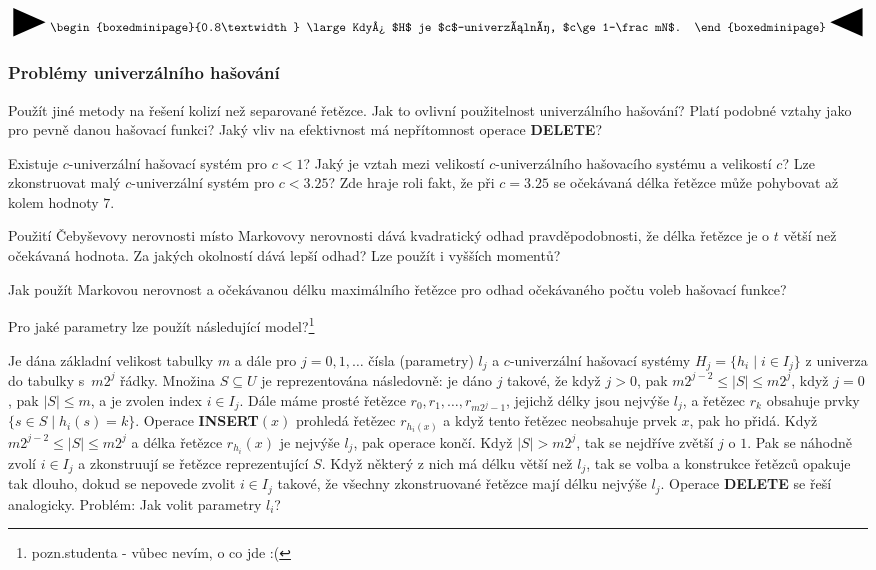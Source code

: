 \documentclass[a4paper,12pt]{article}
\newcommand{\zapamatovat}[1]{
 {
 
 \setlength\fboxrule{5pt}
 \begin{center}
 $\vcenter{
 \hbox{\raisebox{-0.8ex}{\scalebox{1.7}{\Huge\RIGHTarrow}}\begin{boxedminipage}{0.8\textwidth}
\large #1
 \end{boxedminipage}\raisebox{-0.8ex}{\scalebox{1.7}{\Huge\LEFTarrow}}}}$
 \end{center}
 }
 }
\begin{document}
\zapamatovat{
Když $H$ je $c$-univerzální, $c\ge 1-\frac mN$.
}

\subsubsection{Problémy univerzálního hašování}

Použít jiné metody na řešení kolizí než 
separované řetězce.
Jak to ovlivní použitelnost 
univerzálního hašování? Platí podobné vztahy jako pro 
pevně danou hašovací funkci? Jaký vliv na efektivnost 
má nepřítomnost operace {\bf DELETE}?

Existuje $c$-univerzální hašovací systém pro 
$c<1$? Jaký je vztah mezi velikostí $c$-univerzální\-ho 
hašovacího systému a velikostí $c$? Lze zkonstruovat 
malý $c$-univerzální systém pro $c<3.25$? Zde hraje roli 
fakt, že při $c=3.25$ se očekávaná délka řetězce 
může pohybovat až kolem hodnoty $7$.

Použití Čebyševovy nerovnosti místo 
Markovovy nerovnosti dává kvadratický odhad 
prav\-dě\-podobnosti, že délka řetězce je o $t$ větší než 
očekávaná hodnota. Za jakých okolností dává lepší 
odhad? Lze použít i vyšších momentů?

Jak použít Markovou nerovnost a očekávanou 
délku maximál\-ní\-ho řetězce pro odhad očeká\-va\-ného 
počtu voleb hašovací funk\-ce? 

Pro jaké parametry lze použít následující model?\footnote{pozn.studenta - vůbec nevím, o co jde :(}

Je dána základní velikost tabulky $m$ a dále pro $
j=0,1,\dots$ 
čísla (parametry) $l_j$ a $c$-univer\-zál\-ní hašovací systémy 
$H_j=\{h_i\mid i\in I_j\}$ z univerza do tabulky s~$m2^j$ řádky.\newline 
Množina $S\subseteq U$ je reprezentována následovně:  je dáno $
j$ 
tako\-vé, že když $j>0$, pak $m2^{j-2}\le |S|\le m2^j$, když $
j=0$, pak 
$|S|\le m$, a je zvolen index $i\in I_j$.  Dále máme prosté řetězce 
$r_0,r_1,\dots,r_{m2^j-1}$, jejichž délky jsou nejvýše $
l_j$, a řetězec $r_k$ 
obsahuje prvky $\{s\in S\mid h_i(s)=k\}$.\newline 
Operace {\bf INSERT$(x)$} prohledá řetězec $r_{h_i(x)}$ a když tento 
ře\-tě\-zec neobsahuje prvek $x$, pak ho přidá.  Když 
$m2^{j-2}\le |S|\le m2^j$ a délka řetězce $r_{h_i}(x)$ je nejvýše $
l_j$, pak 
operace končí.  Když $|S|>m2^j$, tak se nejdříve zvětší $
j$ o $1$.  
Pak se náhodně zvolí $i\in I_j$ a zkonstruují se řetězce 
reprezentující $S$.  Když některý z nich má délku větší než $
l_j$, 
tak se volba a konstrukce řetězců opakuje tak dlouho, 
dokud se nepovede zvolit $i\in I_j$ takové, že všechny 
zkonstruované řetězce mají délku nejvýše $l_j$.  Operace {\bf DELETE }
se řeší analogicky.\newline 
Problém:  Jak volit parametry $l_i$?  
\end{document}
